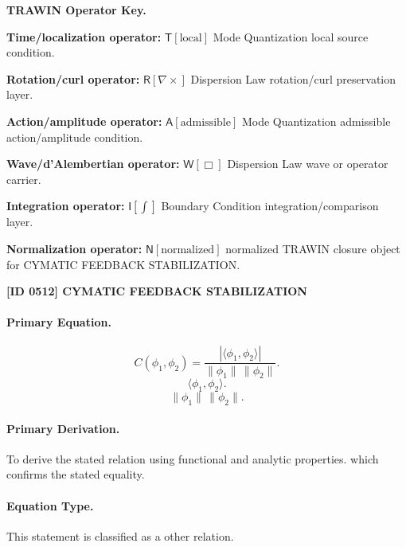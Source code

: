 \par\vspace{0.45\baselineskip}
\noindent\begin{minipage}[t]{\linewidth}
\begingroup
\small
\raggedright
\textbf{TRAWIN Operator Key.}\par
\noindent\textbf{Time/localization operator:} $\mathsf{T}\!\left[\mathrm{local}\right]$ Mode Quantization local source condition.\par
\noindent\textbf{Rotation/curl operator:} $\mathsf{R}\!\left[\nabla\times\right]$ Dispersion Law rotation/curl preservation layer.\par
\noindent\textbf{Action/amplitude operator:} $\mathsf{A}\!\left[\mathrm{admissible}\right]$ Mode Quantization admissible action/amplitude condition.\par
\noindent\textbf{Wave/d'Alembertian operator:} $\mathsf{W}\!\left[\Box\right]$ Dispersion Law wave or operator carrier.\par
\noindent\textbf{Integration operator:} $\mathsf{I}\!\left[\int\right]$ Boundary Condition integration/comparison layer.\par
\noindent\textbf{Normalization operator:} $\mathsf{N}\!\left[\mathrm{normalized}\right]$ normalized TRAWIN closure object for CYMATIC FEEDBACK STABILIZATION.\par
\endgroup
\end{minipage}

\clearpage
\noindent\textbf{[ID 0512] CYMATIC FEEDBACK STABILIZATION}\par
\vspace{0.35em}
\paragraph{Primary Equation.}
\[
C(\phi_1,\phi_2) = \frac{ \left|\langle \phi_1,\phi_2\rangle\right| }{ \lVert \phi_1\rVert\,\lVert \phi_2\rVert }.
\]
\[
\langle \phi_1,\phi_2\rangle.
\]
\[
\lVert \phi_1\rVert\,\lVert \phi_2\rVert.
\]

\paragraph{Primary Derivation.}
To derive the stated relation using functional and analytic properties. which confirms the stated equality.
\paragraph{Equation Type.}
This statement is classified as a other relation.

